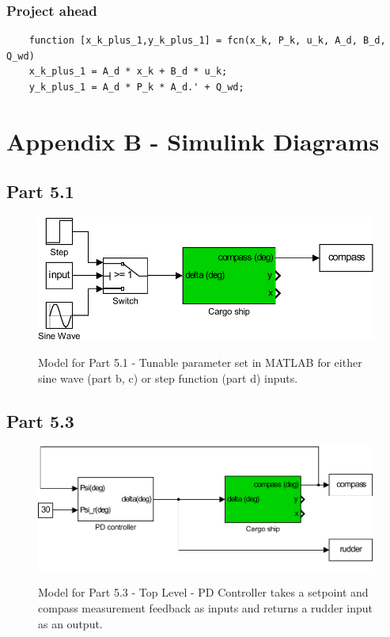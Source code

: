 \begin{subappendices}
\subsubsection{Project ahead}
\begin{lstlisting}
    function [x_k_plus_1,y_k_plus_1] = fcn(x_k, P_k, u_k, A_d, B_d, Q_wd)
    x_k_plus_1 = A_d * x_k + B_d * u_k;
    y_k_plus_1 = A_d * P_k * A_d.' + Q_wd;
\end{lstlisting}
\end{subappendices}

\section{Appendix B - Simulink Diagrams}
\begin{subappendices}
\subsection{Part 5.1}
\begin{figure}[h!]
\caption{Model for Part 5.1 - Tunable parameter set in MATLAB for either sine wave (part b, c) or step function (part d) inputs.}
	\centering
		\includegraphics[width=\textwidth]{images/simulink/ship_p1.pdf}
	\label{fig:ship_p1}
\end{figure}






\subsection{Part 5.3}
\begin{figure}[h!]
\caption{Model for Part 5.3 - Top Level - PD Controller takes a setpoint and compass measurement feedback as inputs and returns a rudder input as an output.}
	\centering
		\includegraphics[width=\textwidth]{images/simulink/ship_p3.pdf}
	\label{fig:ship_p3}
\end{figure}



\end{subappendices}
